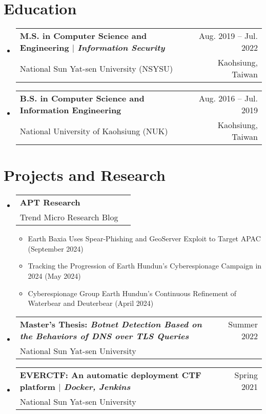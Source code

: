 \documentclass[A4,11pt]{article}
\makeatletter
\newcommand{\CVItem}[1]{
  \item\small{
    {#1 \vspace{-2pt}}
  }
}
\newcommand{\CVSubheading}[4]{
  \vspace{-2pt}\item
    \begin{tabular*}{0.97\textwidth}[t]{l@{\extracolsep{\fill}}r}
      \textbf{#1} & #2 \\
      \small#3 & \small #4 \\
    \end{tabular*}\vspace{-7pt}
}
\newcommand{\CVSubHeadingListStart}{\begin{itemize}[leftmargin=0.5cm, label={}]}
\newcommand{\CVSubHeadingListEnd}{\end{itemize}}
\newcommand{\CVItemListStart}{\begin{itemize}}
\newcommand{\CVItemListEnd}{\end{itemize}\vspace{-5pt}}
\makeatother
\begin{document}
\section{Education}
  \CVSubHeadingListStart
    \CVSubheading
      {M.S. in Computer Science and Engineering $|$ \emph{\small{Information Security}}}{Aug. 2019 -- Jul. 2022}
      {National Sun Yat-sen University (NSYSU)}{Kaohsiung, Taiwan}
    \CVSubheading
      {B.S. in Computer Science and Information Engineering}{Aug. 2016 -- Jul. 2019}
      {National University of Kaohsiung (NUK)}{Kaohsiung, Taiwan}
  \CVSubHeadingListEnd

\begin{comment}
  Ideally the title of the work should speak for what it is. However if you feel
  like you should explain more about why the project is applicable to this job,
  use item list as is shown in the work experience section.
  \end{comment}
  
  \section{Projects and Research}
    \CVSubHeadingListStart
      \CVSubheading
        {APT Research}{}
        {Trend Micro Research Blog}{}
        \CVItemListStart
          \CVItem{Earth Baxia Uses Spear-Phishing and GeoServer Exploit to Target APAC (September 2024)}
          \CVItem{Tracking the Progression of Earth Hundun's Cyberespionage Campaign in 2024 (May 2024)}
          \CVItem{Cyberespionage Group Earth Hundun's Continuous Refinement of Waterbear and Deuterbear (April 2024)}
        \CVItemListEnd
      \CVSubheading
        {Master’s Thesis: \emph{Botnet Detection Based on the Behaviors of DNS over TLS Queries}}{Summer 2022}
        {National Sun Yat-sen University}{}
      \CVSubheading
        {EVERCTF: An automatic deployment CTF platform $|$ \emph{\small{Docker, Jenkins}}}{Spring 2021}
        {National Sun Yat-sen University}{}
    \CVSubHeadingListEnd

\begin{comment}
Again the title should have already been enough, but if it is necessary to add
descriptions maintain the consistency from prior sections
\end{comment}
\end{document}
